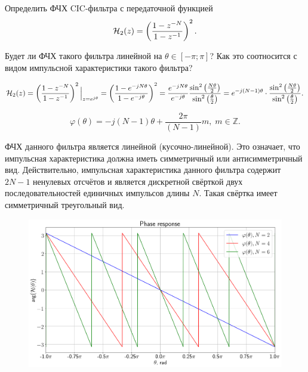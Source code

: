 Определить ФЧХ CIC-фильтра с передаточной функцией
\begin{equation*}
	\mathcal{H}_2(z) = \left(\dfrac{1 - z^{-N}}{1 - z^{-1}}\right)^2.
\end{equation*}

Будет ли ФЧХ такого фильтра линейной на $\theta \in [-\pi; \pi]$?
Как это соотносится с видом импульсной характеристики такого фильтра?

\begin{equation*}
	\mathcal{H}_2(z) = \left(\dfrac{1 - z^{-N}}{1 - z^{-1}}\right)^2\Big|_{z = e^{j \theta}} =
	\left(\dfrac{1 - e^{-jN\theta}}{1 - e^{-j\theta}}\right)^2 =
	\dfrac{e^{-jN\theta}}{e^{-j\theta}} \dfrac{\sin^2\left(\frac{N \theta}{2}\right)}{\sin^2\left(\frac{\theta}{2}\right)} =
	e^{-j(N-1)\theta} \cdot \dfrac{\sin^2\left(\frac{N \theta}{2}\right)}{\sin^2\left(\frac{\theta}{2}\right)}.
\end{equation*}

\begin{equation*}
	\varphi(\theta) = -j(N-1)\theta + \frac{2\pi}{(N-1)}m,\; m \in \mathbb{Z}.
\end{equation*}

ФЧХ данного фильтра является линейной (кусочно-линейной). Это означает, что импульсная характеристика должна иметь симметричный или антисимметричный вид.
Действительно, импульсная характеристика данного фильтра содержит $2N-1$ ненулевых отсчётов и является дискретной свёрткой двух последовательностей единичных импульсов длины $N$. Такая свёртка имеет симметричный треугольный вид.

\begin{figure}[!h]
	\centering
	\includegraphics[width=0.8\columnwidth]{pics/fall/13/13-3.png}
	\label{fig:13-3}
\end{figure}
